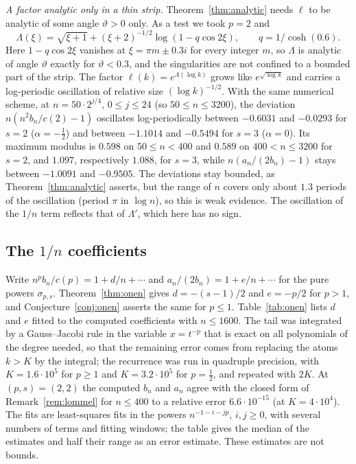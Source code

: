 \emph{A factor analytic only in a thin strip.} Theorem~\ref{thm:analytic} needs $\ell$ to be analytic of some angle
$\vartheta>0$ only. As a test we took $p=2$ and
\[
  \Lambda(\xi)=\sqrt{\xi+1}+(\xi+2)^{-1/2}\log(1-q\cos2\xi),\qquad q=1/\cosh(0.6).
\]
Here $1-q\cos2\xi$ vanishes at $\xi=\pi m\pm0.3i$ for every integer $m$, so $\Lambda$ is analytic of angle $\vartheta$
exactly for $\vartheta<0.3$, and the singularities are not confined to a bounded part of the strip. The factor
$\ell(k)=e^{\Lambda(\log k)}$ grows like $e^{\sqrt{\log k}}$ and carries a log-periodic oscillation of relative size
$(\log k)^{-1/2}$. With the same numerical scheme, at $n=50\cdot2^{j/4}$, $0\le j\le24$ (so $50\le n\le3200$), the
deviation $n(n^2b_n/c(2)-1)$ oscillates log-periodically between $-0.6031$ and $-0.0293$ for $s=2$
($\alpha=-\frac12$) and between $-1.1014$ and $-0.5494$ for $s=3$ ($\alpha=0$). Its maximum modulus is $0.598$ on
$50\le n<400$ and $0.589$ on $400<n\le3200$ for $s=2$, and $1.097$, respectively $1.088$, for $s=3$, while
$n(a_n/(2b_n)-1)$ stays between $-1.0091$ and $-0.9505$. The deviations stay bounded, as
Theorem~\ref{thm:analytic} asserts, but the range of $n$ covers only about $1.3$ periods of the oscillation (period $\pi$
in $\log n$), so this is weak evidence. The oscillation of the $1/n$ term reflects that of $\Lambda'$, which here has
no sign.

\subsection{\texorpdfstring{The $1/n$ coefficients}{The 1/n coefficients}}
Write $n^pb_n/c(p)=1+d/n+\cdots$ and $a_n/(2b_n)=1+e/n+\cdots$ for the pure powers $\sigma_{p,s}$.
Theorem~\ref{thm:onen} gives $d=-(s-1)/2$ and $e=-p/2$ for $p>1$, and Conjecture~\ref{conj:onen} asserts the same for
$p\le1$. Table~\ref{tab:onen} lists $d$ and $e$ fitted to the computed coefficients with $n\le1600$. The tail was
integrated by a Gauss--Jacobi rule in the variable $x=t^{-p}$ that is exact on all polynomials of the degree needed, so
that the remaining error comes from replacing the atoms $k>K$ by the integral; the recurrence was run in quadruple
precision, with $K=1.6\cdot10^5$ for $p\ge1$ and $K=3.2\cdot10^5$ for $p=\frac12$, and repeated with $2K$. At
$(p,s)=(2,2)$ the computed $b_n$ and $a_n$ agree with the closed form of Remark~\ref{rem:lommel} for $n\le400$ to a
relative error $6.6\cdot10^{-15}$ (at $K=4\cdot10^4$). The fits are least-squares fits in the powers
$n^{-1-i-jp}$, $i,j\ge0$, with several numbers of terms and fitting windows; the table gives the median of the estimates
and half their range as an error estimate. These estimates are not bounds.

